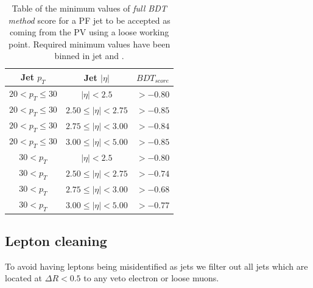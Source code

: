 \begin{table}[!htb]
\centering
\begin{tabular}{|c|c|c|}
\hline
Jet $p_{T}$          & Jet $|\eta|$              & $BDT_{score}$ \\
\hline \hline
$20 < p_{T} \leq 30$ & $|\eta| < 2.5$            & $> -0.80$ \\
$20 < p_{T} \leq 30$ & $2.50 \leq |\eta| < 2.75$ & $> -0.85$ \\
$20 < p_{T} \leq 30$ & $2.75 \leq |\eta| < 3.00$ & $> -0.84$ \\
$20 < p_{T} \leq 30$ & $3.00 \leq |\eta| < 5.00$ & $> -0.85$ \\
$30 < p_{T}$         & $|\eta| < 2.5$            & $> -0.80$ \\
$30 < p_{T}$         & $2.50 \leq |\eta| < 2.75$ & $> -0.74$ \\
$30 < p_{T}$         & $2.75 \leq |\eta| < 3.00$ & $> -0.68$ \\
$30 < p_{T}$         & $3.00 \leq |\eta| < 5.00$ & $> -0.77$ \\
\hline
\end{tabular}
\caption[Table of the minimum values of full BDT method score for a PF jet to be accepted as coming from the PV using a loose working point. Required minimum values have been binned in jet \pt and \eta.]{Table of the minimum values of \textit{full \gls{BDT} method} score for a \gls{PF} jet to be accepted as coming from the \gls{PV} using a loose working point. Required minimum values have been binned in jet \pt and \eta.}
\label{TABLE:EventReconstructionAndSimulation_PileupJetIDFullBDTLooseWorkingPoint}
\end{table}

\subsection{Lepton cleaning}
\label{SECTION:EventReconstructionAndSimulation_Jets_LeptonCleaning}


To avoid having leptons being misidentified as jets we filter out all jets which are located at $\Delta R < 0.5$ to any veto electron or loose muons.

